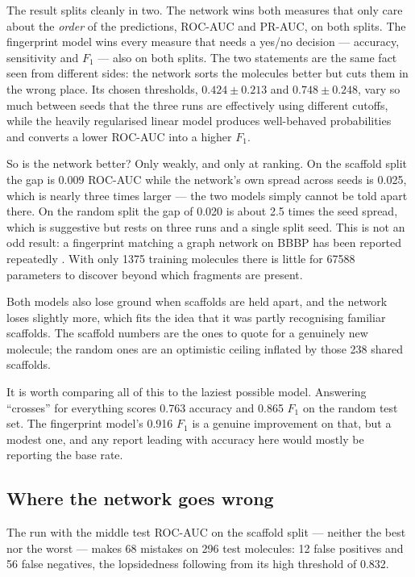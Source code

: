 The result splits cleanly in two. The network wins both measures that only care about the \emph{order} of the predictions, ROC-AUC and PR-AUC, on both splits. The fingerprint model wins every measure that needs a yes/no decision --- accuracy, sensitivity and $F_1$ --- also on both splits. The two statements are the same fact seen from different sides: the network sorts the molecules better but cuts them in the wrong place. Its chosen thresholds, $0.424 \pm 0.213$ and $0.748 \pm 0.248$, vary so much between seeds that the three runs are effectively using different cutoffs, while the heavily regularised linear model produces well-behaved probabilities and converts a lower ROC-AUC into a higher $F_1$.

So is the network better? Only weakly, and only at ranking. On the scaffold split the gap is 0.009 ROC-AUC while the network's own spread across seeds is 0.025, which is nearly three times larger --- the two models simply cannot be told apart there. On the random split the gap of 0.020 is about 2.5 times the seed spread, which is suggestive but rests on three runs and a single split seed. This is not an odd result: a fingerprint matching a graph network on BBBP has been reported repeatedly \parencite{Chemprop}. With only 1375 training molecules there is little for \num{67588} parameters to discover beyond which fragments are present.

Both models also lose ground when scaffolds are held apart, and the network loses slightly more, which fits the idea that it was partly recognising familiar scaffolds. The scaffold numbers are the ones to quote for a genuinely new molecule; the random ones are an optimistic ceiling inflated by those 238 shared scaffolds.

It is worth comparing all of this to the laziest possible model. Answering ``crosses'' for everything scores 0.763 accuracy and 0.865 $F_1$ on the random test set. The fingerprint model's 0.916 $F_1$ is a genuine improvement on that, but a modest one, and any report leading with accuracy here would mostly be reporting the base rate.

\subsection{Where the network goes wrong}

The run with the middle test ROC-AUC on the scaffold split --- neither the best nor the worst --- makes 68 mistakes on 296 test molecules: 12 false positives and 56 false negatives, the lopsidedness following from its high threshold of 0.832.

